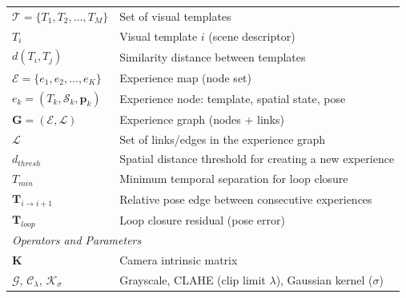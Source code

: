 {\begin{longtable}{p{}p{}}
            $\mathcal{T} = \{T_1, T_2, \ldots, T_M\}$                   & Set of visual templates                                              \\
            $T_i$                                                       & Visual template $i$ (scene descriptor)                               \\
            $d(T_i, T_j)$                                               & Similarity distance between templates                                \\
            $\mathcal{E} = \{e_1, e_2, \ldots, e_K\}$                   & Experience map (node set)                                            \\
            $e_k = (T_k, \mathcal{S}_k, \mathbf{p}_k)$                  & Experience node: template, spatial state, pose                       \\
            $\mathbf{G} = (\mathcal{E}, \mathcal{L})$                   & Experience graph (nodes + links)                                     \\
            $\mathcal{L}$                                               & Set of links/edges in the experience graph                           \\
            $d_{thresh}$                                                & Spatial distance threshold for creating a new experience             \\
            $T_{min}$                                                   & Minimum temporal separation for loop closure                         \\
            $\mathbf{T}_{i \to i+1}$                                    & Relative pose edge between consecutive experiences                   \\
            $\mathbf{T}_{loop}$                                         & Loop closure residual (pose error)                                   \\
            \midrule
            \multicolumn{2}{l}{\textit{Operators and Parameters}}                                                                              \\
            $\mathbf{K}$                                                & Camera intrinsic matrix                                              \\
            $\mathcal{G},\,\mathcal{C}_\lambda,\,\mathcal{K}_\sigma$    & Grayscale, CLAHE (clip limit $\lambda$), Gaussian kernel ($\sigma$)  \\

\end{longtable}}
